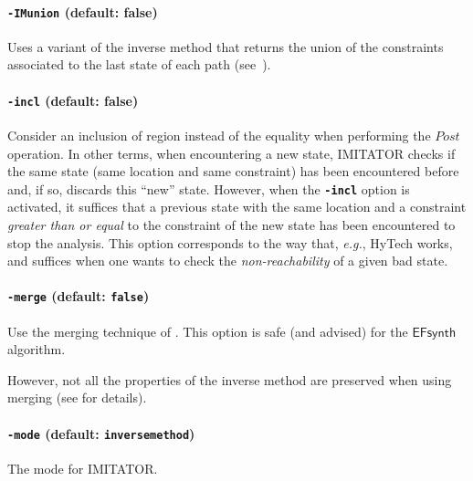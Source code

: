 \documentclass[a4paper,11pt]{report}
\makeatletter
\newcommand{\EFsynth}{\ensuremath{\mathsf{EFsynth}}}
\newcommand{\hytech}{{\sc HyTech}}
\newcommand{\imitator}{\textsf{IMITATOR}}
\newcommand{\code}[1]{\textbf{\texttt{#1}}}
\newcommand{\styleOption}[1]{\textcolor{optioncolor}{\texttt{#1}}}
\newcommand{\eg}{\textcolor{colorok}{\textit{e.g.},\@}}
\makeatother
\begin{document}
\paragraph{\styleOption{-IMunion} (default: false)}
Uses a variant of the inverse method that returns the union of the constraints associated to the last state of each path (see~\cite{AS13}).


\paragraph{\styleOption{-incl} (default: false)}
Consider an inclusion of region instead of the equality when performing the $\textit{Post}$ operation.
In other terms, when encountering a new state, \imitator{} checks if the same state (same location and same constraint) has been encountered before and, if so, discards this ``new'' state.
However, when the \code{-incl} option is activated, it suffices that a previous state with the same location and a constraint \emph{greater than or equal} to the constraint of the new state has been encountered to stop the analysis.
This option corresponds to the way that, \eg{} \hytech{} works, and suffices when one wants to check the \emph{non-reachability} of a given bad state.


\paragraph{\styleOption{-merge} (default: \code{false})}
Use the merging technique of \cite{AFS13atva}.
This option is safe (and advised) for the \EFsynth{} algorithm.

However, not all the properties of the inverse method are preserved when using merging (see \cite{AFS13atva} for details).



\paragraph{\styleOption{-mode} (default: \styleOption{inversemethod})}
The mode for \imitator{}.
\end{document}
